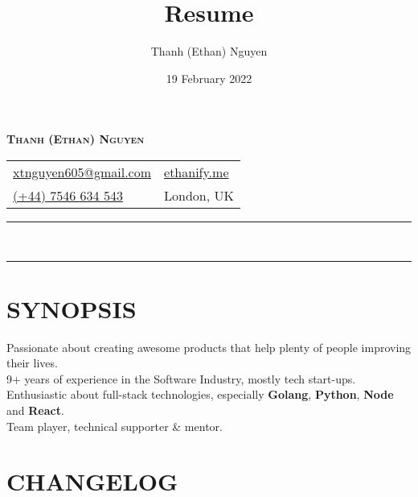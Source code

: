 \documentclass[12pt]{extarticle}
\title{Resume}
\author{Thanh (Ethan) Nguyen}
\date{19 February 2022}
\newcommand{\secondary}[1]{\textcolor{secondary}{\textbf{#1}}}
\begin{document}
\setlength\parindent{0pt}
\pagecolor{background}
\color{foreground}

\begin{center}
  \textcolor{primary}{\LARGE\bfseries\scshape{Thanh (Ethan) Nguyen}}
\end{center}

\begin{tabularx}{\textwidth}{
    @{}
    >{\raggedright\arraybackslash}X
    >{\raggedleft\arraybackslash}X
    @{}
  }
  \href{mailto:xtnguyen605@gmail.com}{\textcolor{secondary}{xtnguyen605@gmail.com}} & \href{https://ethanify.me}{\textcolor{secondary}{ethanify.me}} \\
  \href{tel:447546634543}{(+44) 7546 634 543} & London, UK \\
\end{tabularx}

\begin{spacing}{0.05}
\rule{\textwidth}{1pt} \\
\rule{\textwidth}{1pt}
\end{spacing}

\section*{SYNOPSIS}

Passionate about creating awesome products that help plenty of people improving their lives. \\
9+ years of experience in the Software Industry, mostly tech start-ups. \\
Enthusiastic about full-stack technologies, especially \secondary{Golang}, \secondary{Python}, \secondary{Node} and \secondary{React}. \\
Team player, technical supporter \& mentor.

\section*{CHANGELOG}
\end{document}

